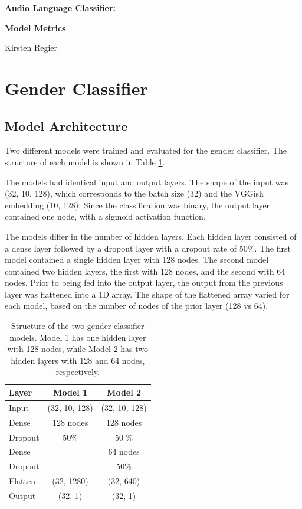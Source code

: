\documentclass[11pt, letterpaper]{article}
\begin{document}
\begin{center}
\Large{\textbf{Audio Language Classifier:}}

\Large{\textbf{Model Metrics}}

\large{Kirsten Regier}
\end{center}

\section{Gender Classifier}
\subsection{Model Architecture}

Two different models were trained and evaluated for the gender classifier. The structure of each model is shown in Table \ref{tab:GenModels}. 

The models had identical input and output layers. The shape of the input was (32, 10, 128), which corresponds to the batch size (32) and the VGGish embedding (10, 128).  Since the classification was binary, the output layer contained one node, with a sigmoid activation function.

The models differ in the number of hidden layers. Each hidden layer consisted of a dense layer followed by a dropout layer with a dropout rate of 50\%. The first model contained a single hidden layer with 128 nodes. The second model contained two hidden layers, the first with 128 nodes, and the second with 64 nodes. Prior to being fed into the output layer, the output from the previous layer was flattened into a 1D array. The shape of the flattened array varied for each model, based on the number of nodes of the prior layer (128 vs 64).

\begin{table}[!h]
\begin{center}
\caption{Structure of the two gender classifier models. Model 1 has one hidden layer with 128 nodes, while Model 2 has two hidden layers with 128 and 64 nodes, respectively.}
\begin{tabular}{l | c | c |}

Layer  & Model 1 & Model 2\\
\hline

Input 	& (32, 10, 128) & (32, 10, 128) \\ \hline

Dense	& 128 nodes & 128 nodes \\
Dropout	& 50\%		& 50 \% \\ \hline

Dense	&			& 64 nodes \\
Dropout	& 			& 50\% \\ \hline

Flatten 	& (32, 1280)	& (32, 640) \\ \hline
Output 	& (32, 1)		& (32, 1)\\
\hline
\end{tabular}

\label{tab:GenModels}
\end{center}
\end{table}
\end{document}
